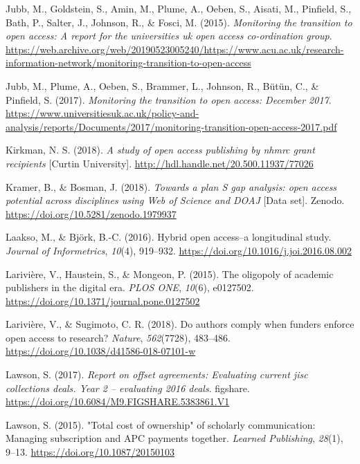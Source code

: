 \documentclass[a4paper,man,floatsintext,longtable,noextraspace,12pt]{apa6}
\newlength{\cslhangindent}
\newenvironment{cslreferences}%
  {\setlength{\parindent}{0pt}%
  \everypar{\setlength{\hangindent}{\cslhangindent}}\ignorespaces}%
  {\par}
\begin{document}
\begin{cslreferences}
\leavevmode\hypertarget{ref-Jubb_2015}{}%
Jubb, M., Goldstein, S., Amin, M., Plume, A., Oeben, S., Aisati, M.,
Pinfield, S., Bath, P., Salter, J., Johnson, R., \& Fosci, M. (2015).
\emph{Monitoring the transition to open access: A report for the
universities uk open access co-ordination group}.
\url{https://web.archive.org/web/20190523005240/https://www.acu.ac.uk/research-information-network/monitoring-transition-to-open-access}

\leavevmode\hypertarget{ref-Jubb_2017}{}%
Jubb, M., Plume, A., Oeben, S., Brammer, L., Johnson, R., Bütün, C., \&
Pinfield, S. (2017). \emph{Monitoring the transition to open access:
December 2017}.
\url{https://www.universitiesuk.ac.uk/policy-and-analysis/reports/Documents/2017/monitoring-transition-open-access-2017.pdf}

\leavevmode\hypertarget{ref-Kirkman_2018}{}%
Kirkman, N. S. (2018). \emph{A study of open access publishing by nhmrc
grant recipients} {[}Curtin University{]}.
\url{http://hdl.handle.net/20.500.11937/77026}

\leavevmode\hypertarget{ref-Kramer_2018}{}%
Kramer, B., \& Bosman, J. (2018). \emph{Towards a plan S gap analysis:
open access potential across disciplines using Web of Science and DOAJ}
{[}Data set{]}. Zenodo. \url{https://doi.org/10.5281/zenodo.1979937}

\leavevmode\hypertarget{ref-Laakso_2016}{}%
Laakso, M., \& Björk, B.-C. (2016). Hybrid open access--a longitudinal
study. \emph{Journal of Informetrics}, \emph{10}(4), 919--932.
\url{https://doi.org/10.1016/j.joi.2016.08.002}

\leavevmode\hypertarget{ref-Larivi_re_2015}{}%
Larivière, V., Haustein, S., \& Mongeon, P. (2015). The oligopoly of
academic publishers in the digital era. \emph{PLOS ONE}, \emph{10}(6),
e0127502. \url{https://doi.org/10.1371/journal.pone.0127502}

\leavevmode\hypertarget{ref-Larivi_re_2018}{}%
Larivière, V., \& Sugimoto, C. R. (2018). Do authors comply when funders
enforce open access to research? \emph{Nature}, \emph{562}(7728),
483--486. \url{https://doi.org/10.1038/d41586-018-07101-w}

\leavevmode\hypertarget{ref-Lawson_2018}{}%
Lawson, S. (2017). \emph{Report on offset agreements: Evaluating current
jisc collections deals. Year 2 -- evaluating 2016 deals}. figshare.
\url{https://doi.org/10.6084/M9.FIGSHARE.5383861.V1}

\leavevmode\hypertarget{ref-Lawson_2015}{}%
Lawson, S. (2015). "Total cost of ownership" of scholarly communication:
Managing subscription and APC payments together. \emph{Learned
Publishing}, \emph{28}(1), 9--13. \url{https://doi.org/10.1087/20150103}


\end{cslreferences}
\end{document}
